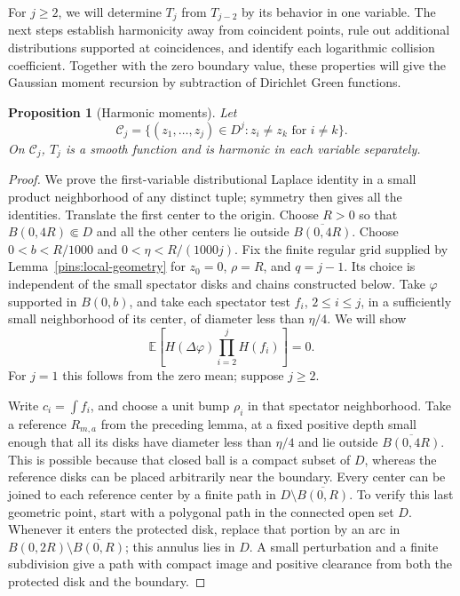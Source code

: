 \documentclass[11pt]{article}
\newcommand{\E}{\mathbb E}
\newtheorem{proposition}[theorem]{Proposition}
\theoremstyle{definition}
\theoremstyle{remark}
\numberwithin{equation}{section}
\begin{document}
For \(j\ge2\), we will determine \(T_j\) from \(T_{j-2}\) by its behavior
in one variable.  The next steps establish harmonicity away from coincident
points, rule out additional distributions supported at coincidences,
and identify each logarithmic collision coefficient.  Together with
the zero boundary value, these properties will give the Gaussian
moment recursion by subtraction of Dirichlet Green functions.

\begin{proposition}[Harmonic moments]
\label{prop:harmonic-moments}
Let
\[
 \mathcal C_j=\{(z_1,\ldots,z_j)\in D^j:
                         z_i\ne z_k\text{ for }i\ne k\}.
\]
On \(\mathcal C_j\), \(T_j\) is a smooth function and is harmonic in
each variable separately.
\end{proposition}

\begin{proof}
We prove the first-variable distributional Laplace identity in a
small product neighborhood of any distinct tuple; symmetry then gives
all the identities.  Translate the first center to the origin.
Choose \(R>0\) so that \(B(0,4R)\Subset D\) and all the other centers
lie outside \(\overline{B(0,4R)}\).  Choose \(0<b<R/1000\) and
\(0<\eta<R/(1000j)\).  Fix the finite regular grid supplied by
Lemma~\ref{pins:local-geometry} for \(z_0=0\), \(\rho=R\), and
\(q=j-1\).  Its choice is independent of the small spectator disks
and chains constructed below.
Take \(\varphi\) supported in \(B(0,b)\), and take each spectator
test \(f_i\), \(2\le i\le j\), in a sufficiently small neighborhood
of its center, of diameter less than \(\eta/4\).
We will show
\begin{equation}
       \E\left[H(\Delta\varphi)\prod_{i=2}^j H(f_i)\right]=0.
       \label{eq:limit-harmonic-tensor}
\end{equation}
For \(j=1\) this follows from the zero mean; suppose \(j\ge2\).

Write \(c_i=\int f_i\), and choose a unit bump \(\rho_i\) in that
spectator neighborhood.  Take a reference \(R_{m,a}\) from the
preceding lemma, at a fixed positive depth small enough that all
its disks have diameter less than \(\eta/4\) and lie outside
\(\overline{B(0,4R)}\).  This is possible because that closed ball
is a compact subset of \(D\), whereas the reference disks can be
placed arbitrarily near the boundary.
Every center can be joined to each reference center by a finite path
in \(D\setminus\overline{B(0,R)}\).  To verify this last geometric
point, start with a polygonal path in the connected open set \(D\).
Whenever it enters the protected disk, replace that portion by an
arc in \(B(0,2R)\setminus\overline{B(0,R)}\); this annulus lies in
\(D\).  A small perturbation and a finite subdivision give a path
with compact image and positive clearance from both the protected
disk and the boundary.


\end{proof}
\end{document}
